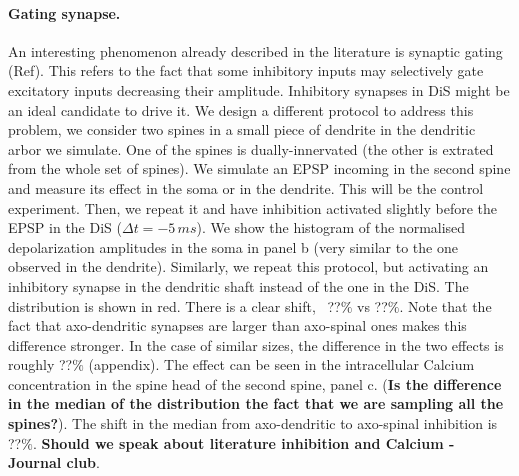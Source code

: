 \documentclass[10pt,letterpaper]{article}
\begin{document}
\paragraph*{Gating synapse.} An interesting phenomenon already described in the literature is synaptic gating (Ref). This refers to the fact that some inhibitory inputs may selectively gate excitatory inputs decreasing their amplitude. Inhibitory synapses in DiS might be an ideal candidate to drive it. We design a different protocol to address this problem, we consider two spines in a small piece of dendrite in the dendritic arbor we simulate. One of the spines is dually-innervated (the other is extrated from the whole set of spines). We simulate an EPSP incoming in the second spine and measure its effect in the soma or in the dendrite. This will be the control experiment. Then, we repeat it and have inhibition activated slightly before the EPSP in the DiS ($\Delta t =-5\,ms$). We show the histogram of the normalised depolarization amplitudes in the soma in panel b (very similar to the one observed in the dendrite). Similarly, we repeat this protocol, but activating an inhibitory synapse in the dendritic shaft instead of the one in the DiS. The distribution is shown in red. There is a clear shift, ~??$\%$ vs ??$\%$. Note that the fact that axo-dendritic synapses are larger than axo-spinal ones makes this difference stronger. In the case of similar sizes, the difference in the two effects is roughly ??$\%$ (appendix). The effect can be seen in the intracellular Calcium concentration in the spine head of the second spine, panel c. ({\bf Is the difference in the median of the distribution the fact that we are sampling all the spines?}). The shift in the median from axo-dendritic to axo-spinal inhibition is ??$\%$. {\bf Should we speak about literature inhibition and Calcium - Journal club}.


\end{document}
